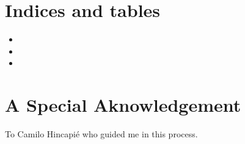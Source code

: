 \documentclass[a4paper,landscape,10pt,english]{sphinxmanual}
\begin{document}
\chapter{Indices and tables}
\label{\detokenize{index:indices-and-tables}}\begin{itemize}
\item {} 

\item {} 

\item {} 

\end{itemize}


\chapter{A Special Aknowledgement}
\label{\detokenize{index:a-special-aknowledgement}}
To Camilo Hincapié who guided me in this process.
\end{document}
